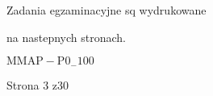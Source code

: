 \documentclass[a4paper,12pt]{article}
\begin{document}
Zadania egzaminacyjne sq wydrukowane

na nastepnych stronach.

$\mathrm{M}\mathrm{M}\mathrm{A}\mathrm{P}-\mathrm{P}0_{-}100$

Strona 3 z30
\end{document}
